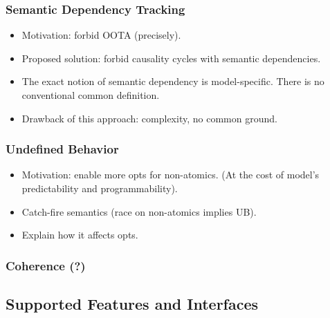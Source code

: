 \subsubsection{Semantic Dependency Tracking}

\begin{itemize}
  \item Motivation: forbid OOTA (precisely).
  \item Proposed solution: forbid causality cycles with semantic dependencies. 
  \item The exact notion of semantic dependency is model-specific.
        There is no conventional common definition.
  \item Drawback of this approach: complexity, no common ground.
\end{itemize}

\subsubsection{Undefined Behavior}
\label{sec:bgrnd-ub}

\begin{itemize}
  \item Motivation: enable more opts for non-atomics.
        (At the cost of model's predictability and programmability).
  \item Catch-fire semantics (race on non-atomics implies UB).
  \item Explain how it affects opts.
\end{itemize}

\subsubsection{Coherence (?)}

\subsection{Supported Features and Interfaces}

